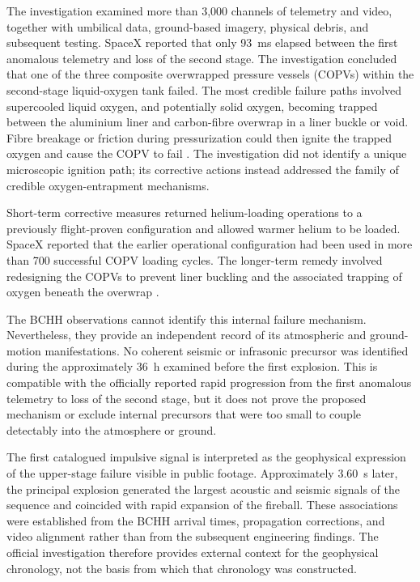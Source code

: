 \documentclass[]{seismica}
\begin{document}
The investigation examined more than 3,000 channels of telemetry and video,
together with umbilical data, ground-based imagery, physical debris, and
subsequent testing. SpaceX reported that only 93~ms elapsed between the first
anomalous telemetry and loss of the second stage. The investigation concluded
that one of the three composite overwrapped pressure vessels (COPVs) within the
second-stage liquid-oxygen tank failed. The most credible failure paths
involved supercooled liquid oxygen, and potentially solid oxygen, becoming
trapped between the aluminium liner and carbon-fibre overwrap in a liner buckle
or void. Fibre breakage or friction during pressurization could then ignite the
trapped oxygen and cause the COPV to fail
\citep{spacex_anomaly_2017,nasa_sma_falcon9}. The investigation did not identify
a unique microscopic ignition path; its corrective actions instead addressed
the family of credible oxygen-entrapment mechanisms.

Short-term corrective measures returned helium-loading operations to a
previously flight-proven configuration and allowed warmer helium to be loaded.
SpaceX reported that the earlier operational configuration had been used in
more than 700 successful COPV loading cycles. The longer-term remedy involved
redesigning the COPVs to prevent liner buckling and the associated trapping of
oxygen beneath the overwrap \citep{spacex_anomaly_2017}.

The BCHH observations cannot identify this internal failure mechanism.
Nevertheless, they provide an independent record of its atmospheric and
ground-motion manifestations. No coherent seismic or infrasonic precursor was
identified during the approximately 36~h examined before the first explosion.
This is compatible with the officially reported rapid progression from the
first anomalous telemetry to loss of the second stage, but it does not prove
the proposed mechanism or exclude internal precursors that were too small to
couple detectably into the atmosphere or ground.

The first catalogued impulsive signal is interpreted as the geophysical
expression of the upper-stage failure visible in public footage. Approximately
3.60~s later, the principal explosion generated the largest acoustic and
seismic signals of the sequence and coincided with rapid expansion of the
fireball. These associations were established from the BCHH arrival times,
propagation corrections, and video alignment rather than from the subsequent
engineering findings. The official investigation therefore provides external
context for the geophysical chronology, not the basis from which that
chronology was constructed.
\end{document}
